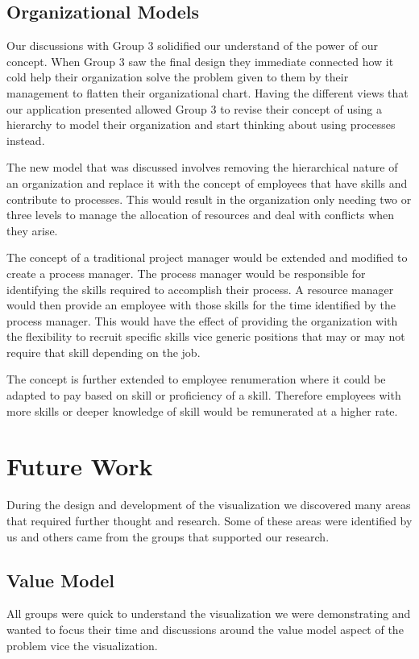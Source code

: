\documentclass[journal]{vgtc}                %
\begin{document}
\subsection{Organizational Models}
Our discussions with Group 3 solidified our understand of the power of our concept.  When Group 3 saw the final design they immediate connected how it cold help their organization solve the problem given to them by their management to flatten their organizational chart.  Having the different views that our application presented allowed Group 3 to revise their concept of using a hierarchy to model their organization and start thinking about using processes instead.

The new model that was discussed involves removing the hierarchical nature of an organization and replace it with the concept of employees that have skills and contribute to processes.  This would result in the organization only needing two or three levels to manage the allocation of resources and deal with conflicts when they arise.

The concept of a traditional project manager would be extended and modified to create a process manager.  The process manager would be responsible for identifying the skills required to accomplish their process.  A resource manager would then provide an employee with those skills for the time identified by the process manager.  This would have the effect of providing the organization with the flexibility to recruit specific skills vice generic positions that may or may not require that skill depending on the job.

The concept is further extended to employee renumeration where it could be adapted to pay based on skill or proficiency of a skill.  Therefore employees with more skills or deeper knowledge of skill would be remunerated at a higher rate.

\section{Future Work}
\label{sec:future}
During the design and development of the visualization we discovered many areas that required further thought and research.  Some of these areas were identified by us and others came from the groups that supported our research.

\subsection{Value Model}
All groups were quick to understand the visualization we were demonstrating and wanted to focus their time and discussions around the value model aspect of the problem vice the visualization.
\end{document}
